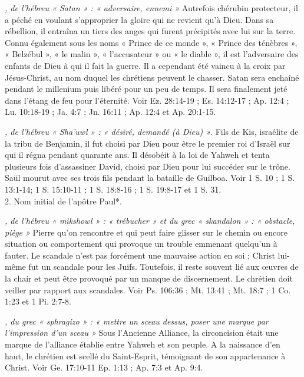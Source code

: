 \begin{multicols}{2}
{\textit{, de l'hébreu « Satan » : « adversaire, ennemi »}\newline
Autrefois chérubin protecteur, il a péché en voulant s'approprier la gloire qui ne revient qu'à Dieu. Dans sa rébellion, il entraîna un tiers des anges qui furent précipités avec lui sur la terre. Connu également sous les noms « Prince de ce monde », « Prince des ténèbres », « Belzébul », « le malin », « l'accusateur » ou « le diable », il est l'adversaire des enfants de Dieu à qui il fait la guerre. Il a cependant été vaincu à la croix par Jésus-Christ, au nom duquel les chrétiens peuvent le chasser. Satan sera enchaîné pendant le millenium puis libéré pour un peu de temps. Il sera finalement jeté dans l'étang de feu pour l'éternité. Voir Ez. 28:14-19 ; Es. 14:12-17 ; Ap. 12:4 ; Lu. 10:18-19 ; Ja. 4:7 ; Jn. 16:11 ; Ap. 12:4 et Ap. 20:1-15.

\textit{, de l'hébreu « Sha'uwl » : « désiré, demandé (à Dieu) »}. Fils de Kis, israélite de la tribu de Benjamin, il fut choisi par Dieu pour être le premier roi d'Israël sur qui il régna pendant quarante ans. Il désobéit à la loi de Yahweh et tenta plusieurs fois d'assassiner David, choisi par Dieu pour lui succéder sur le trône. Saül mourut avec ses trois fils pendant la bataille de Guilboa. Voir 1 S. 10 ; 1 S. 13:1-14; 1 S. 15:10-11 ; 1 S. 18:8-16 ; 1 S. 19:8-17 et 1 S. 31.
\\2. Nom initial de l'apôtre Paul*.

\textit{, de l'hébreu « mikshowl » : « trébucher » et du grec « skandalon » : « obstacle, piège »}\newline
Pierre qu'on rencontre et qui peut faire glisser sur le chemin ou encore situation ou comportement qui provoque un trouble emmenant quelqu'un à fauter. Le scandale n'est pas forcément une mauvaise action en soi ; Christ lui-même fut un scandale pour les Juifs. Toutefois, il reste souvent lié aux œuvres de la chair et peut être provoqué par un manque de discernement. Le chrétien doit veiller par rapport aux scandales. Voir Ps. 106:36 ; Mt. 13:41 ; Mt. 18:7 ; 1 Co. 1:23 et 1 Pi. 2:7-8.

\textit{, du grec « sphragizo » : « mettre un sceau dessus, poser une marque par l'impression d'un sceau »}\newline
Sous l'Ancienne Alliance, la circoncision était une marque de l'alliance établie entre Yahweh et son peuple. A la naissance d'en haut, le chrétien est scellé du Saint-Esprit, témoignant de son appartenance à Christ. Voir Ge. 17:10-11 Ep. 1:13 ; Ap. 7:3 et Ap. 9:4.

}
\end{multicols}

